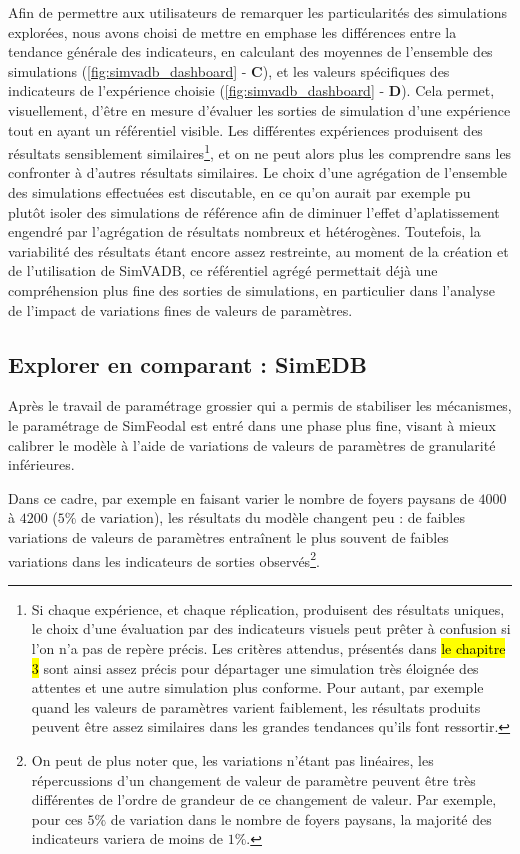 	Afin de permettre aux utilisateurs de remarquer les particularités des simulations explorées, nous avons choisi de mettre en emphase les différences entre la tendance générale des indicateurs, en calculant des moyennes de l'ensemble des simulations (\cref{fig:simvadb_dashboard} - \textbf{C}), et les valeurs spécifiques des indicateurs de l'expérience choisie (\cref{fig:simvadb_dashboard} - \textbf{D}).
	Cela permet, visuellement, d'être en mesure d'évaluer les sorties de simulation d'une expérience tout en ayant un référentiel visible.
	Les différentes expériences produisent des résultats sensiblement similaires\footnote{
		Si chaque expérience, et chaque réplication, produisent des résultats uniques, le choix d'une évaluation par des indicateurs visuels peut prêter à confusion si l'on n'a pas de repère précis.
		Les critères attendus, présentés dans \hl{le chapitre 3} sont ainsi assez précis pour départager une simulation très éloignée des attentes et une autre simulation plus conforme.
		Pour autant, par exemple quand les valeurs de paramètres varient faiblement, les résultats produits peuvent être assez similaires dans les grandes tendances qu'ils font ressortir.

	}, et on ne peut alors plus les comprendre sans les confronter à d'autres résultats similaires.
	Le choix d'une agrégation de l'ensemble des simulations effectuées est discutable, en ce qu'on aurait par exemple pu plutôt isoler des simulations \og de référence \fg{} afin de diminuer l'effet \og d'aplatissement \fg{} engendré par l'agrégation de résultats nombreux et hétérogènes.
	Toutefois, la variabilité des résultats étant encore assez restreinte, au moment de la création et de l'utilisation de SimVADB, ce référentiel agrégé permettait déjà une compréhension plus fine des sorties de simulations, en particulier dans l'analyse de l'impact de variations fines de valeurs de paramètres.

	\subsection{Explorer en comparant : SimEDB}\label{subsec:explorer-simedb}

	Après le travail de paramétrage grossier qui a permis de stabiliser les mécanismes, le paramétrage de SimFeodal est entré dans une phase plus fine, visant à mieux calibrer le modèle à l'aide de variations de valeurs de paramètres de granularité inférieures.

	Dans ce cadre, par exemple en faisant varier le nombre de foyers paysans de $4000$ à $4200$ ($5\%$ de variation), les résultats du modèle changent peu :  de faibles variations de valeurs de paramètres entraînent le plus souvent de faibles variations dans les indicateurs de sorties observés\footnote{
	On peut de plus noter que, les variations n'étant pas linéaires, les répercussions d'un changement de valeur de paramètre peuvent être très différentes de l'ordre de grandeur de ce changement de valeur. Par exemple, pour ces $5\%$ de variation dans le nombre de foyers paysans, la majorité des indicateurs variera de moins de $1\%$.
	}.

